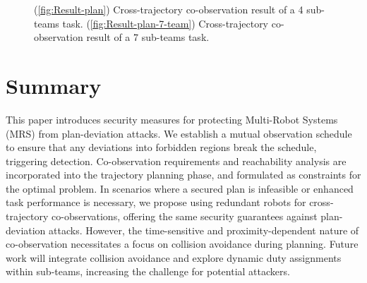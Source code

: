 \documentclass[10pt,twocolumn,twoside]{IEEEtran}
\begin{document}
\begin{figure}
  \centering
  \caption{(\ref{fig:Result-plan}) Cross-trajectory co-observation result of a 4 sub-teams task. (\ref{fig:Result-plan-7-team}) Cross-trajectory co-observation result of a 7 sub-teams task.}\label{fig:Cross-trajectory-result}
\end{figure}

\section{Summary}\label{sec:summary}

This paper introduces security measures for protecting Multi-Robot Systems (MRS) from plan-deviation attacks. We establish a mutual observation schedule to ensure that any deviations into forbidden regions break the schedule, triggering detection. Co-observation requirements and reachability analysis are incorporated into the trajectory planning phase, and formulated as constraints for the optimal problem. In scenarios where a secured plan is infeasible or enhanced task performance is necessary, we propose using redundant robots for cross-trajectory co-observations, offering the same security guarantees against plan-deviation attacks. However, the time-sensitive and proximity-dependent nature of co-observation necessitates a focus on collision avoidance during planning. Future work will integrate collision avoidance and explore dynamic duty assignments within sub-teams, increasing the challenge for potential attackers.
\end{document}
